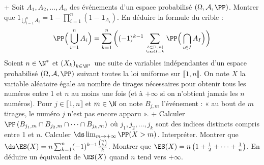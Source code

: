 \begin{exercise}[title=Formule du crible]
\question+ Soit $A_{1}, A_{2}, \ldots, A_{n}$ des événements d'un espace probabilisé $(\Omega, \mathcal{A}, \PP)$. Montrer que $1_{\bigcup_{i=1}^{n} A_{i}}=1-\prod_{i=1}^{n}\left(1-\mathbf{1}_{A_{i}}\right) $. En déduire la formule du crible :
\begin{equation*}
\PP\Big(\bigcup_{i=1}^{n} A_{i}\Big)=\sum_{k=1}^{n}\bigg((-1)^{k-1} \sum_{I \subset[1, n] \atop \card I=k} \PP\Big(\bigcap_{i \in I} A_{I}\Big)\bigg)
\end{equation*}
\question Soient $n \in \N^{*}$ et $\left(X_{k}\right)_{k \in \N^{*}}$ une suite de variables indépendantes d'un espace probabilisé $(\Omega, \mathcal{A}, \PP)$ suivant toutes la loi uniforme sur $\llbracket 1, n \rrbracket $. On note $X$ la variable aléatoire égale au nombre de tirages nécessaires pour obtenir tous les numéros entre 1 et $n$ au moins une fois (et à $+\infty$ si on n'obtient jamais les $n$ numéros). Pour $j \in \llbracket 1, n \rrbracket$ et $m \in \N$ on note $B_{j, m}$ l'événement : « au bout de $m$ tirages, le numéro $j$ n'est pas encore apparu ».
\question+ Calculer $\PP\left(B_{j_{1}, m} \cap B_{j_{2}, m} \cap \cdots \cap B_{j_{k}, m}\right)$ où $j_{1}, j_{2}, \ldots, j_{k}$ sont des indices
distincts compris entre 1 et $n$.
\question {}
Calculer $\ds\lim _{m \rightarrow+\infty} \PP(X>m)$. Interpréter.
\question Montrer que 
$\ds\ES(X)=n \sum_{k=1}^{n}(-1)^{k-1} \frac{\binom nk}{k}$. 
\question Montrer que $\ES(X)=n\left(1+\frac{1}{2}+\cdots+\frac{1}{n}\right) $. En déduire un équivalent de $\ES(X)$ quand $n$ tend vers $+\infty$.
\endquestions 
\end{exercise}

